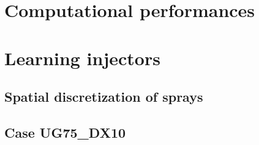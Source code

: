 \section{Computational performances}
\label{subsec:ch5_computational_performances}


\section{Learning injectors}



\subsection{Spatial discretization of sprays}

\clearpage

\subsection{Case UG75\_DX10}





